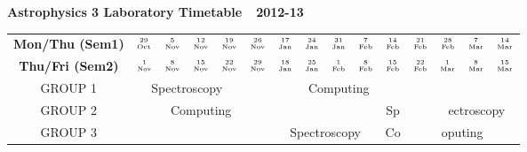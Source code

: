 \documentclass[12pt]{article}
\begin{document}
\begin{center}
{\Large {\bf Astrophysics 3 Laboratory Timetable\ \ 2012-13}}\\

\bigskip

\begin{tabular}{|c|ccccc||ccccccccc|}\hline
{{\scriptsize\bf Mon/Thu (Sem1)}} &
 $\stackrel{\mbox{\tiny 29}}{\mbox{\tiny Oct}}$ &
 $\stackrel{\mbox{\tiny  5}}{\mbox{\tiny Nov}}$ &
 $\stackrel{\mbox{\tiny 12}}{\mbox{\tiny Nov}}$ &
 $\stackrel{\mbox{\tiny 19}}{\mbox{\tiny Nov}}$ &
 $\stackrel{\mbox{\tiny 26}}{\mbox{\tiny Nov}}$ &
 $\stackrel{\mbox{\tiny 17}}{\mbox{\tiny Jan}}$ &
 $\stackrel{\mbox{\tiny 24}}{\mbox{\tiny Jan}}$ &
 $\stackrel{\mbox{\tiny 31}}{\mbox{\tiny Jan}}$ & 
 $\stackrel{\mbox{\tiny  7}}{\mbox{\tiny Feb}}$ &
 $\stackrel{\mbox{\tiny 14}}{\mbox{\tiny Feb}}$ &
 $\stackrel{\mbox{\tiny 21}}{\mbox{\tiny Feb}}$ &
 $\stackrel{\mbox{\tiny 28}}{\mbox{\tiny Feb}}$ &
 $\stackrel{\mbox{\tiny  7}}{\mbox{\tiny Mar}}$ &
 $\stackrel{\mbox{\tiny  14}}{\mbox{\tiny Mar}}$ \\
{{\scriptsize\bf Thu/Fri (Sem2)}} &
 $\stackrel{\mbox{\tiny  1}}{\mbox{\tiny Nov}}$ &
 $\stackrel{\mbox{\tiny  8}}{\mbox{\tiny Nov}}$ &
 $\stackrel{\mbox{\tiny 15}}{\mbox{\tiny Nov}}$ &
 $\stackrel{\mbox{\tiny 22}}{\mbox{\tiny Nov}}$ &
 $\stackrel{\mbox{\tiny 29}}{\mbox{\tiny Nov}}$ &
 $\stackrel{\mbox{\tiny 18}}{\mbox{\tiny Jan}}$ &
 $\stackrel{\mbox{\tiny 25}}{\mbox{\tiny Jan}}$ &
 $\stackrel{\mbox{\tiny  1}}{\mbox{\tiny Feb}}$ & 
 $\stackrel{\mbox{\tiny  8}}{\mbox{\tiny Feb}}$ &
 $\stackrel{\mbox{\tiny 15}}{\mbox{\tiny Feb}}$ &
 $\stackrel{\mbox{\tiny 22}}{\mbox{\tiny Feb}}$ &
 $\stackrel{\mbox{\tiny  1}}{\mbox{\tiny Mar}}$ &
 $\stackrel{\mbox{\tiny  8}}{\mbox{\tiny Mar}}$ &
 $\stackrel{\mbox{\tiny  15}}{\mbox{\tiny Mar}}$ \\
\hline
\hline
GROUP 1 &\multicolumn{4}{c|}{Spectroscopy}&\multicolumn{2}{c|}{ }&\multicolumn{3}{c|}{Computing}&\multicolumn{5}{c|}{ }\\
\hline
GROUP 2 &\multicolumn{1}{c|}{ }&\multicolumn{3}{c|}{Computing}&\multicolumn{5}{c|}{}&\multicolumn{1}{c|}{Sp}&\multicolumn{1}{c|}{}&\multicolumn{3}{c|}{ectroscopy}\\
\hline
GROUP 3 & \multicolumn{5}{c|}{ }&\multicolumn{4}{c|}{Spectroscopy} & \multicolumn{1}{c|}{Co}&\multicolumn{1}{c|}{}&\multicolumn{2}{c|}{oputing}&\multicolumn{1}{c|}{}\\
\hline
\end{tabular}
\end{center}
\end{document}
